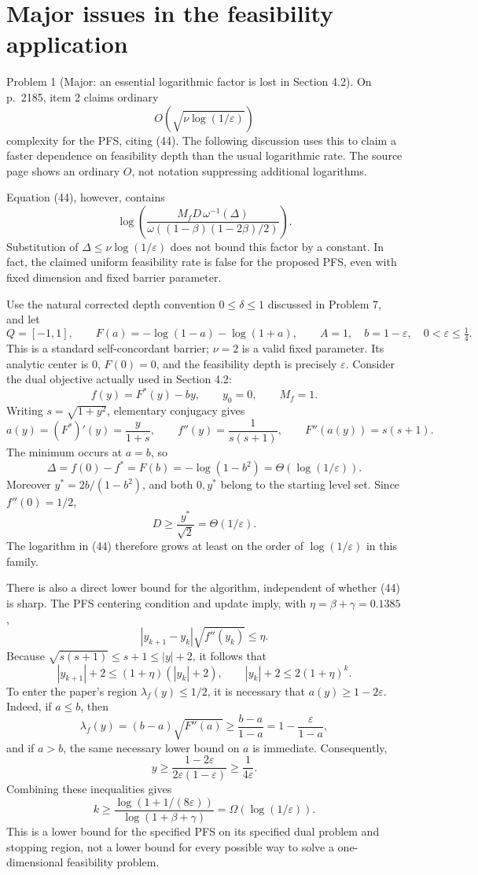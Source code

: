 \documentclass[10pt]{article}
\begin{document}
\section*{Major issues in the feasibility application}
Problem 1 (Major: an essential logarithmic factor is lost in Section 4.2).  On p. 2185, item 2 claims ordinary \[O\!\left(\sqrt{\nu\log(1/\varepsilon)}\right)\] complexity for the PFS, citing (44). The following discussion uses this to claim a faster dependence on feasibility depth than the usual logarithmic rate. The source page shows an ordinary \(O\), not notation suppressing additional logarithms.\par
Equation (44), however, contains \[\log\!\left(
 \frac{M_f D\,\omega^{-1}(\Delta)}
 {\omega((1-\beta)(1-2\beta)/2)}
 \right).\] Substitution of \(\Delta\leq\nu\log(1/\varepsilon)\) does not bound this factor by a constant. In fact, the claimed uniform feasibility rate is false for the proposed PFS, even with fixed dimension and fixed barrier parameter.\par
Use the natural corrected depth convention \(0\leq\delta\leq1\) discussed in Problem 7, and let \[Q=[-1,1],\qquad F(a)=-\log(1-a)-\log(1+a),\qquad
 A=1,\quad b=1-\varepsilon,\quad 0<\varepsilon\leq\tfrac14.\] This is a standard self-concordant barrier; \(\nu=2\) is a valid fixed parameter. Its analytic center is \(0\), \(F(0)=0\), and the feasibility depth is precisely \(\varepsilon\). Consider the dual objective actually used in Section 4.2: \[f(y)=F^\ast(y)-by,\qquad y_0=0,\qquad M_f=1.\] Writing \(s=\sqrt{1+y^2}\), elementary conjugacy gives \[a(y)=(F^\ast)'(y)=\frac{y}{1+s},\qquad
 f''(y)=\frac{1}{s(s+1)},\qquad
 F''(a(y))=s(s+1).\] The minimum occurs at \(a=b\), so \[\Delta=f(0)-f^\ast=F(b)=-\log(1-b^2)
       =\Theta(\log(1/\varepsilon)).\] Moreover \(y^\ast=2b/(1-b^2)\), and both \(0,y^\ast\) belong to the starting level set. Since \(f''(0)=1/2\), \[D\geq \frac{y^\ast}{\sqrt2}=\Theta(1/\varepsilon).\] The logarithm in (44) therefore grows at least on the order of \(\log(1/\varepsilon)\) in this family.\par
There is also a direct lower bound for the algorithm, independent of whether (44) is sharp. The PFS centering condition and update imply, with \(\eta=\beta+\gamma=0.1385\), \[|y_{k+1}-y_k|\sqrt{f''(y_k)}\leq\eta.\] Because \(\sqrt{s(s+1)}\leq s+1\leq |y|+2\), it follows that \[|y_{k+1}|+2\leq(1+\eta)(|y_k|+2),\qquad
 |y_k|+2\leq2(1+\eta)^k.\] To enter the paper’s region \(\lambda_f(y)\leq1/2\), it is necessary that \(a(y)\geq1-2\varepsilon\). Indeed, if \(a\leq b\), then \[\lambda_f(y)=(b-a)\sqrt{F''(a)}
 \geq \frac{b-a}{1-a}
 =1-\frac{\varepsilon}{1-a},\] and if \(a>b\), the same necessary lower bound on \(a\) is immediate. Consequently, \[y\geq \frac{1-2\varepsilon}{2\varepsilon(1-\varepsilon)}
 \geq\frac{1}{4\varepsilon}.\] Combining these inequalities gives \[k\geq
 \frac{\log(1+1/(8\varepsilon))}{\log(1+\beta+\gamma)}
 =\Omega(\log(1/\varepsilon)).\] This is a lower bound for the specified PFS on its specified dual problem and stopping region, not a lower bound for every possible way to solve a one-dimensional feasibility problem.\par
\end{document}

